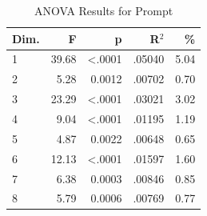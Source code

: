 \begin{table}[H]
  \centering
  \caption{ANOVA Results for Prompt}
  \label{tab:anova_prompt}
  \begin{tabular}{l r r r r}
    Dim. & F & p & R$^2$ & \% \\
    \hline
    1 & 39.68 & <.0001 & .05040 & 5.04 \\
    2 & 5.28 & 0.0012 & .00702 & 0.70 \\
    3 & 23.29 & <.0001 & .03021 & 3.02 \\
    4 & 9.04 & <.0001 & .01195 & 1.19 \\
    5 & 4.87 & 0.0022 & .00648 & 0.65 \\
    6 & 12.13 & <.0001 & .01597 & 1.60 \\
    7 & 6.38 & 0.0003 & .00846 & 0.85 \\
    8 & 5.79 & 0.0006 & .00769 & 0.77 \\
  \end{tabular}
\end{table}
